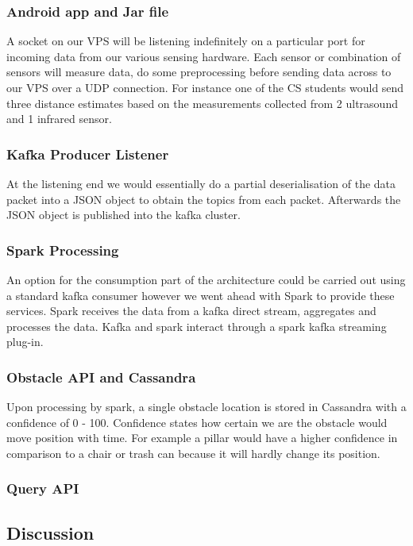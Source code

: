 \documentclass[prodmode,acmtosem]{acmsmall} %
\begin{document}
\subsubsection{Android app and Jar file}
A socket on our VPS will be listening indefinitely on a particular port for incoming data from our various sensing hardware. Each sensor or combination of sensors will measure data, do some preprocessing before sending data across to our VPS over a UDP connection. For instance one of the CS students would send three distance estimates based on the measurements collected from 2 ultrasound and 1 infrared sensor.


\subsubsection{Kafka Producer Listener}
At the listening end we would essentially do a partial deserialisation of the data packet into a JSON object to obtain the topics from each packet. Afterwards the JSON object is published into the kafka cluster.

\subsubsection{Spark Processing}
An option for the consumption part of the architecture could be carried out using a standard kafka consumer however we went ahead with Spark to provide these services. Spark receives the data from a kafka direct stream, aggregates and processes the data. Kafka and spark interact through a spark kafka streaming plug-in. 

\subsubsection{Obstacle API and Cassandra}
Upon processing by spark, a single obstacle location is stored in Cassandra with a confidence of 0 - 100. Confidence states how certain we are the obstacle would move position with time. For example a pillar would have a higher confidence in comparison to a chair or trash can because it will hardly change its position.


\subsubsection{Query API}

\subsection{Discussion}
\end{document}
